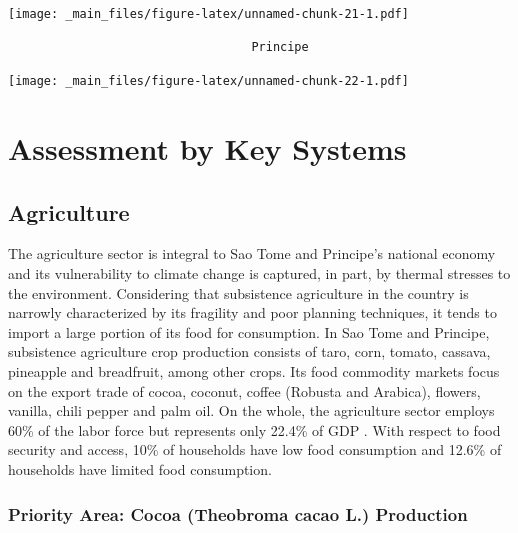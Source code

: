 \documentclass[
]{book}
\begin{document}
\texttt{[image: \_main\_files/figure-latex/unnamed-chunk-21-1.pdf]}

\begin{verbatim}
                                  Principe
\end{verbatim}

\texttt{[image: \_main\_files/figure-latex/unnamed-chunk-22-1.pdf]}

\hypertarget{assessment-by-key-systems}{%
\section{Assessment by Key Systems}\label{assessment-by-key-systems}}

\hypertarget{agriculture}{%
\subsection{Agriculture}\label{agriculture}}

The agriculture sector is integral to Sao Tome and Principe's national economy and its vulnerability to climate change is captured, in part, by thermal stresses to the environment. Considering that subsistence agriculture in the country is narrowly characterized by its fragility and poor planning techniques, it tends to import a large portion of its food for consumption. In Sao Tome and Principe, subsistence agriculture crop production consists of taro, corn, tomato, cassava, pineapple and breadfruit, among other crops. Its food commodity markets focus on the export trade of cocoa, coconut, coffee (Robusta and Arabica), flowers, vanilla, chili pepper and palm oil. On the whole, the agriculture sector employs 60\% of the labor force but represents only 22.4\% of GDP . With respect to food security and access, 10\% of households have low food consumption and 12.6\% of households have limited food consumption.

\hypertarget{priority-area-cocoa-theobroma-cacao-l.-production}{%
\subsubsection{Priority Area: Cocoa (Theobroma cacao L.) Production}\label{priority-area-cocoa-theobroma-cacao-l.-production}}
\end{document}
